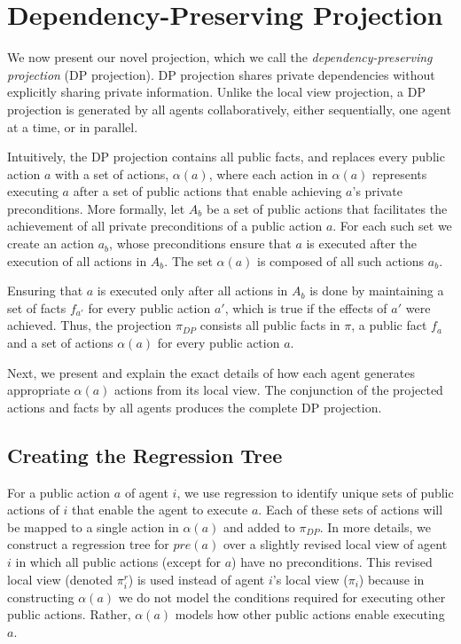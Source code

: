 \documentclass[letterpaper]{article}
\newcommand{\pre}{\textit{pre}}
\theoremstyle{definition}
\begin{document}
\section{Dependency-Preserving Projection}

We now present our novel projection, which we call the {\em dependency-preserving projection} (DP projection). DP projection shares private dependencies without explicitly sharing private information. Unlike the local view projection, a DP projection is generated by all agents collaboratively, either sequentially, one agent at a time, or in parallel.

Intuitively, the DP projection contains all public facts, and replaces every public action $a$ with a set of actions, $\alpha(a)$, where each action in $\alpha(a)$ represents executing $a$ after a set of public actions that enable achieving $a$'s private preconditions.
More formally, let $A_b$ be a set of public actions that facilitates the achievement of all private preconditions of a public action $a$. For each such set we create an action $a_b$, whose preconditions ensure that $a$ is executed after the execution of all actions in $A_b$. The set $\alpha(a)$ is composed of all such actions $a_b$.

Ensuring that $a$ is executed only after all actions in $A_b$ is done by maintaining a set of facts $f_{a'}$ for every public action $a'$, which is true if the effects of $a'$ were achieved. Thus, the projection $\pi_{DP}$ consists all public facts in $\pi$, a public fact $f_a$ and a set of actions $\alpha(a)$ for every public action $a$.

Next, we present and explain the exact details of how each agent generates appropriate $\alpha(a)$ actions from its local view. The conjunction of the projected actions and facts by all agents produces the complete DP projection.














\subsection{Creating the Regression Tree}


For a public action $a$ of agent $i$, we use regression to identify unique sets of public actions of $i$ that enable the agent to execute $a$. Each of these sets of actions will be mapped to a single action in $\alpha(a)$ and added to $\pi_{DP}$.
In more details, we construct a regression tree for $\pre(a)$ over a slightly revised local view of agent $i$ in which all public actions (except for $a$) have no preconditions. This revised local view (denoted $\pi_i^r$) is used instead of agent $i$'s local view ($\pi_i$) because in constructing $\alpha(a)$ we do not model the conditions required for executing other public actions. Rather, $\alpha(a)$ models how other public actions enable executing $a$.
\end{document}

